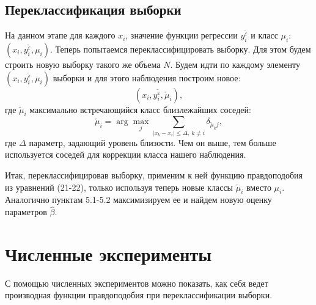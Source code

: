 \documentclass[12pt]{article}
\begin{document}
\subsection{Переклассификация выборки}
На данном этапе для каждого $x_i$, значение функции регрессии $y_i^{\widetilde{\varepsilon}}$ и класс $\mu_i$: $(x_i,y_i^{\widetilde{\varepsilon}},\mu_i)$.
Теперь попытаемся переклассифицировать выборку. 
Для этом будем строить новую выборку такого же объема $N$.
Будем идти по каждому элементу $(x_i, y_i^{\widetilde{\varepsilon}}, \mu_i)$ выборки и для этого наблюдения построим новое:
\begin{equation}
    (x_i, y_i^{\widetilde{\varepsilon}},\check{\mu}_i),
\end{equation}
где $\check{\mu}_i$ максимально встречающийся класс близлежайших соседей:
\begin{equation}
    \check{\mu}_i = \arg\max_j \sum_{|x_k-x_i|\leq \Delta,~k\neq i} \delta_{\check{\mu}_k j},
\end{equation}
где $\Delta$ параметр, задающий уровень близости. Чем он выше, тем больше используется соседей для коррекции класса нашего наблюдения.

Итак, переклассифицировав выборку, применим к ней функцию правдоподобия из уравнений (21-22), только используя теперь новые классы $\check{\mu}_i$ вместо $\mu_i$. 
Аналогично пунктам 5.1-5.2 максимизируем ее и найдем новую оценку параметров $\hat{\beta}$.

\section{Численные эксперименты}
С помощью численных экспериментов можно показать, как себя ведет производная функции правдоподобия при переклассификации выборки.
\end{document}
